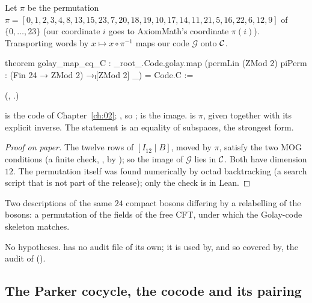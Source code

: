 \begin{theorem}\label{ch21:thm:golaymatch}
Let $\pi$ be the permutation
$\pi=[0,1,2,3,4,8,13,15,23,7,20,18,19,10,17,14,11,21,5,16,22,6,12,9]$ of $\{0,\dots,23\}$ (our
coordinate $i$ goes to AxiomMath's coordinate $\pi(i)$).  Transporting words by $x\mapsto x\circ\pi^{-1}$
maps our code $\mathcal G$ onto $\mathcal{C}$.
\end{theorem}
\begin{leancode}
theorem golay_map_eq_C :
    _root_.Code.golay.map (permLin (ZMod 2) piPerm : (Fin 24 → ZMod 2) →ₗ[ZMod 2] _) = Code.C :=
\end{leancode}
(,
.)
\begin{dictionary}
 is the code of Chapter~\ref{ch:02}; , so
;  is the image.   is $\pi$, given
together with its explicit inverse.  The statement is an equality of subspaces, the strongest form.
\end{dictionary}
\begin{proof}[Proof on paper]
The twelve rows of $[I_{12}\mid B]$, moved by $\pi$, satisfy the two MOG conditions (a finite check,
, by ); so the image of $\mathcal G$ lies in
$\mathcal{C}$.  Both have dimension $12$.  The permutation itself was found numerically by octad
backtracking (a search script that is not part of the release); only the check is in Lean.
\end{proof}
\begin{physics}
Two descriptions of the same $24$ compact bosons differing by a relabelling of the bosons: a
permutation of the fields of the free CFT, under which the Golay-code skeleton matches.
\end{physics}
\begin{status}
No hypotheses.   has no audit file of its own; it is used by, and so
covered by, the audit of  ().
\end{status}

\subsection{The Parker cocycle, the cocode and its pairing}

